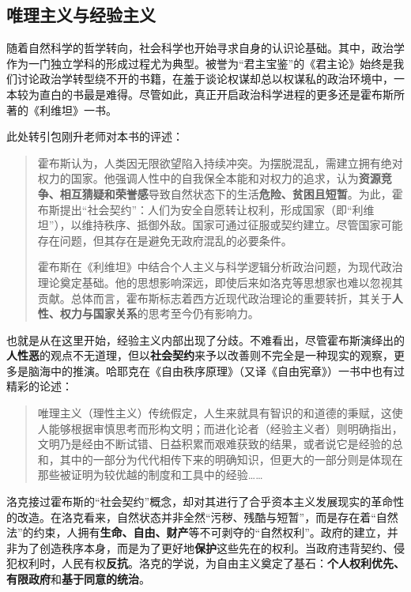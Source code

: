 \subsection{唯理主义与经验主义}

随着自然科学的哲学转向，社会科学也开始寻求自身的认识论基础。其中，政治学作为一门独立学科的形成过程尤为典型。被誉为“君主宝鉴”的《君主论》始终是我们讨论政治学转型绕不开的书籍，在羞于谈论权谋却总以权谋私的政治环境中，一本较为直白的书最是难得。尽管如此，真正开启政治科学进程的更多还是霍布斯所著的《利维坦》一书。

此处转引包刚升老师对本书的评述：\textsuperscript{\cite{2}}

\begin{quote}
	{\fangsong 霍布斯认为，人类因无限欲望陷入持续冲突。为摆脱混乱，需建立拥有绝对权力的国家。他强调人性中的自我保全本能和对权力的追求，认为\textbf{资源竞争、相互猜疑和荣誉感}导致自然状态下的生活\textbf{危险、贫困且短暂}。为此，霍布斯提出“社会契约”：人们为安全自愿转让权利，形成国家（即“利维坦”），以维持秩序、抵御外敌。国家可通过征服或契约建立。尽管国家可能存在问题，但其存在是避免无政府混乱的必要条件。
		
	霍布斯在《利维坦》中结合个人主义与科学逻辑分析政治问题，为现代政治理论奠定基础。他的思想影响深远，即使后来如洛克等思想家也难以忽视其贡献。总体而言，霍布斯标志着西方近现代政治理论的重要转折，其关于\textbf{人性、权力与国家关系}的思考至今仍有影响力。}
\end{quote}

也就是从在这里开始，经验主义内部出现了分歧。不难看出，尽管霍布斯演绎出的\textbf{人性恶}的观点不无道理，但以\textbf{社会契约}来予以改善则不完全是一种现实的观察，更多是脑海中的推演。哈耶克在《自由秩序原理》（又译《自由宪章》）一书中也有过精彩的论述：\textsuperscript{\cite{3}}

\begin{quote}
	{\fangsong 唯理主义（理性主义）传统假定，人生来就具有智识的和道德的秉赋，这使人能够根据审慎思考而形构文明；而进化论者（经验主义者）则明确指出，文明乃是经由不断试错、日益积累而艰难获致的结果，或者说它是经验的总和，其中的一部分为代代相传下来的明确知识，但更大的一部分则是体现在那些被证明为较优越的制度和工具中的经验\ldots\ldots{}}
\end{quote}

洛克接过霍布斯的“社会契约”概念，却对其进行了合乎资本主义发展现实的革命性的改造。在洛克看来，自然状态并非全然“污秽、残酷与短暂”，而是存在着“自然法”的约束，人拥有\textbf{生命、自由、财产}等不可剥夺的“自然权利”。政府的建立，并非为了创造秩序本身，而是为了更好地\textbf{保护}这些先在的权利。当政府违背契约、侵犯权利时，人民有权\textbf{反抗}。洛克的学说，为自由主义奠定了基石：\textbf{个人权利优先、有限政府}和\textbf{基于同意的统治}。

